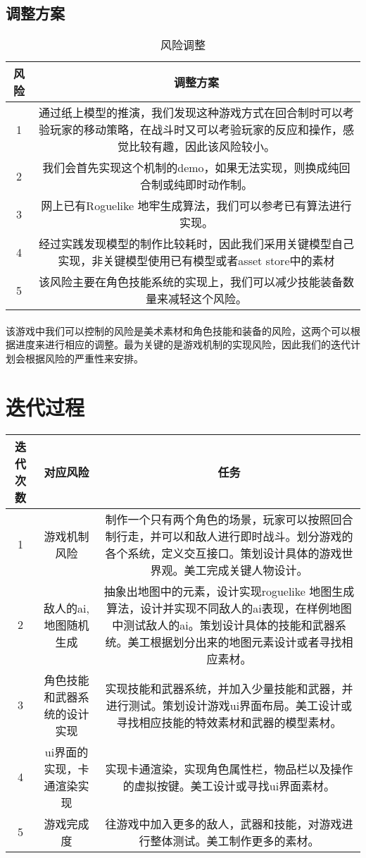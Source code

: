 \documentclass{article}
\begin{document}
\subsection{调整方案}
\begin{table}[htbp]
	\centering
	\caption{风险调整}
	\begin{tabular}{|c|c|}
		\hline
		风险 & 调整方案 \\
		\hline
		1 & 通过纸上模型的推演，我们发现这种游戏方式在回合制时可以考验玩家的移动策略，在战斗时又可以考验玩家的反应和操作，感觉比较有趣，因此该风险较小。 \\
		\hline
		2 & 我们会首先实现这个机制的demo，如果无法实现，则换成纯回合制或纯即时动作制。 \\
		\hline
		3 & 网上已有Roguelike 地牢生成算法，我们可以参考已有算法进行实现。 \\
		\hline
		4 & 经过实践发现模型的制作比较耗时，因此我们采用关键模型自己实现，非关键模型使用已有模型或者asset store中的素材 \\
		\hline 
		5 & 该风险主要在角色技能系统的实现上，我们可以减少技能装备数量来减轻这个风险。 \\
		\hline
	\end{tabular}
\end{table}
\paragraph{}
该游戏中我们可以控制的风险是美术素材和角色技能和装备的风险，这两个可以根据进度来进行相应的调整。最为关键的是游戏机制的实现风险，因此我们的迭代计划会根据风险的严重性来安排。
\section{迭代过程}
\begin{table}[htbp]
	\centering
	\begin{tabular}{|c|c|c|}
		\hline
		迭代次数 & 对应风险 & 任务 \\
		\hline
		1 & 游戏机制风险 & 制作一个只有两个角色的场景，玩家可以按照回合制行走，并可以和敌人进行即时战斗。划分游戏的各个系统，定义交互接口。策划设计具体的游戏世界观。美工完成关键人物设计。 \\
		\hline
		2 & 敌人的ai,地图随机生成 & 抽象出地图中的元素，设计实现roguelike 地图生成算法，设计并实现不同敌人的ai表现，在样例地图中测试敌人的ai。策划设计具体的技能和武器系统。美工根据划分出来的地图元素设计或者寻找相应素材。 \\
		\hline
		3 & 角色技能和武器系统的设计实现 & 实现技能和武器系统，并加入少量技能和武器，并进行测试。策划设计游戏ui界面布局。美工设计或寻找相应技能的特效素材和武器的模型素材。 \\
		\hline
		4 & ui界面的实现，卡通渲染实现 & 实现卡通渲染，实现角色属性栏，物品栏以及操作的虚拟按键。美工设计或寻找ui界面素材。 \\
		\hline 
		5 & 游戏完成度 & 往游戏中加入更多的敌人，武器和技能，对游戏进行整体测试。美工制作更多的素材。 \\
		\hline
	\end{tabular}
\end{table}
\end{document}
